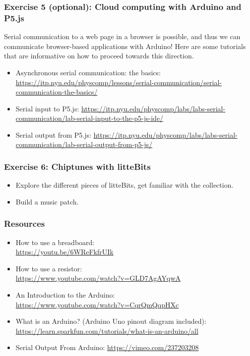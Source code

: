 \documentclass[screen, aspectratio=43]{beamer}
\begin{document}
%
\begin{frame}
  \frametitle{Exercise 5 (optional): Cloud computing with Arduino and P5.js}
  Serial communication to a web page in a browser is possible, and thus we can communicate browser-based applications with Arduino! Here are some tutorials that are informative on how to proceed towards this direction.
    \begin{itemize}
    	\item Asynchronous serial communication: the basics: \url{https://itp.nyu.edu/physcomp/lessons/serial-communication/serial-communication-the-basics/}
    	\item Serial input to P5.js: \url{https://itp.nyu.edu/physcomp/labs/labs-serial-communication/lab-serial-input-to-the-p5-js-ide/}
	\item Serial output from P5.js: \url{https://itp.nyu.edu/physcomp/labs/labs-serial-communication/lab-serial-output-from-p5-js/}
    \end{itemize}
\end{frame}
%
\begin{frame}
  \frametitle{Exercise 6: Chiptunes with litteBits}
    \begin{itemize}
    	\item Explore the different pieces of litteBits, get familiar with the collection.
	\item Build a music patch.
    \end{itemize}
\end{frame}
%
\begin{frame}
  \frametitle{Resources}
    \begin{itemize}
    	\item How to use a breadboard:\\
	\url{https://youtu.be/6WReFkfrUIk}
	\item How to use a resistor:\\
	\url{https://www.youtube.com/watch?v=GLD7AgAYqwA}
	\item An Introduction to the Arduino:\\
	\url{https://www.youtube.com/watch?v=CqrQmQqpHXc}
	\item What is an Arduino? (Arduino Uno pinout diagram included): \\
	\url{https://learn.sparkfun.com/tutorials/what-is-an-arduino/all}
	\item Serial Output From Arduino: 
	\url{https://vimeo.com/237203208}
    \end{itemize}
\end{frame}
%
%
\end{document}
